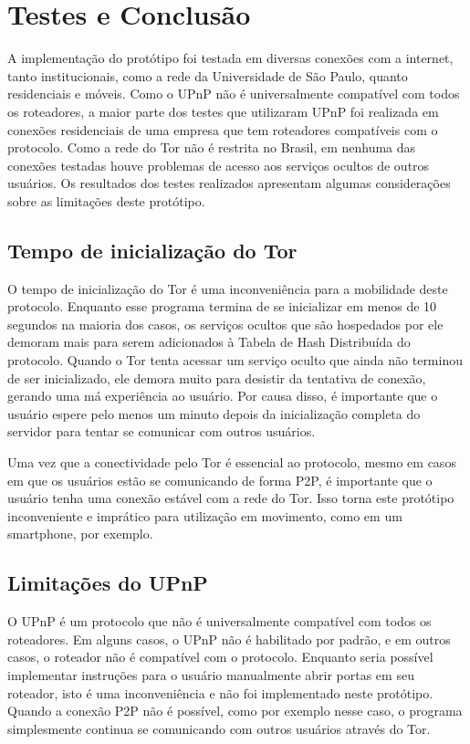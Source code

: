 \chapter{Testes e Conclusão}

A implementação do protótipo foi testada em diversas conexões com a internet, tanto institucionais, como a rede da Universidade de São Paulo, quanto residenciais e móveis. Como o UPnP não é universalmente compatível com todos os roteadores, a maior parte dos testes que utilizaram UPnP foi realizada em conexões residenciais de uma empresa que tem roteadores compatíveis com o protocolo. Como a rede do Tor não é restrita no Brasil, em nenhuma das conexões testadas houve problemas de acesso aos serviços ocultos de outros usuários. Os resultados dos testes realizados apresentam algumas considerações sobre as limitações deste protótipo.

\section{Tempo de inicialização do Tor}

O tempo de inicialização do Tor é uma inconveniência para a mobilidade deste protocolo. Enquanto esse programa termina de se inicializar em menos de 10 segundos na maioria dos casos, os serviços ocultos que são hospedados por ele demoram mais para serem adicionados à Tabela de Hash Distribuída do protocolo. Quando o Tor tenta acessar um serviço oculto que ainda não terminou de ser inicializado, ele demora muito para desistir da tentativa de conexão, gerando uma má experiência ao usuário. Por causa disso, é importante que o usuário espere pelo menos um minuto depois da inicialização completa do servidor para tentar se comunicar com outros usuários.

Uma vez que a conectividade pelo Tor é essencial ao protocolo, mesmo em casos em que os usuários estão se comunicando de forma P2P, é importante que o usuário tenha uma conexão estável com a rede do Tor. Isso torna este protótipo inconveniente e imprático para utilização em movimento, como em um smartphone, por exemplo.

\section{Limitações do UPnP}

O UPnP é um protocolo que não é universalmente compatível com todos os roteadores. Em alguns casos, o UPnP não é habilitado por padrão, e em outros casos, o roteador não é compatível com o protocolo. Enquanto seria possível implementar instruções para o usuário manualmente abrir portas em seu roteador, isto é uma inconveniência e não foi implementado neste protótipo. Quando a conexão P2P não é possível, como por exemplo nesse caso, o programa simplesmente continua se comunicando com outros usuários através do Tor.

